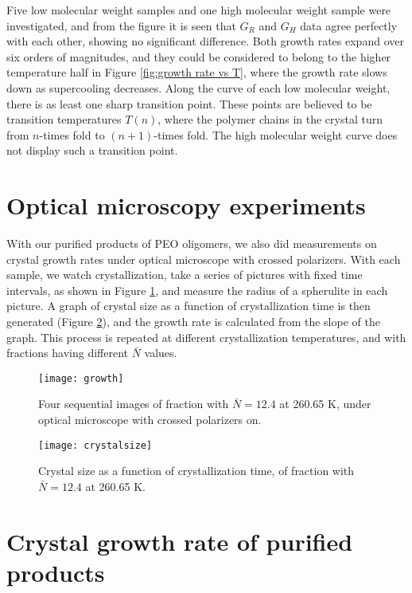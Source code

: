 Five low molecular weight samples and one high molecular weight sample were investigated, and from the figure it is seen that $G_{R}$ and $G_{H}$ data agree perfectly with each other, showing no significant difference. Both growth rates expand over six orders of magnitudes, and they could be considered to belong to the higher temperature half in Figure \ref{fig:growth rate vs T}, where the growth rate slows down as supercooling decreases. Along the curve of each low molecular weight, there is as least one sharp transition point. These points are believed to be transition temperatures $T(n)$, where the polymer chains in the crystal turn from $n$-times fold to $(n+1)$-times fold. The high molecular weight curve does not display such a transition point.

\section{Optical microscopy experiments}

With our purified products of PEO oligomers, we also did measurements on crystal growth rates under optical microscope with crossed polarizers. With each sample, we watch crystallization, take a series of pictures with fixed time intervals, as shown in Figure \ref{fig:growth}, and measure the radius of a spherulite in each picture. A graph of crystal size as a function of crystallization time is then generated (Figure \ref{fig:crystal size}), and the growth rate is calculated from the slope of the graph. This process is repeated at different crystallization temperatures, and with fractions having different $\bar{N}$ values.

\begin{figure}[H]
\center
\vspace{1 cm}
\texttt{[image: growth]}
\caption{Four sequential images of fraction with $\bar{N} = 12.4$ at 260.65 K, under optical microscope with crossed polarizers on.}
\label{fig:growth}
\end{figure}

\begin{figure}[H]
	\center
	\vspace{1 cm}
	\texttt{[image: crystalsize]}
	\caption{Crystal size as a function of crystallization time, of fraction with $\bar{N} = 12.4$ at 260.65 K.}
	\label{fig:crystal size}
\end{figure}

\section{Crystal growth rate of purified products}

